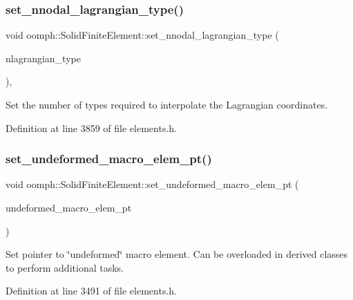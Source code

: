 \subsubsection{\texorpdfstring{set\+\_\+nnodal\+\_\+lagrangian\+\_\+type()}{set\_nnodal\_lagrangian\_type()}}
{\footnotesize\ttfamily void oomph\+::\+Solid\+Finite\+Element\+::set\+\_\+nnodal\+\_\+lagrangian\+\_\+type (\begin{DoxyParamCaption}\item[{const unsigned \&}]{nlagrangian\+\_\+type }\end{DoxyParamCaption})\hspace{0.3cm}{\ttfamily [inline]}, {\ttfamily [protected]}}



Set the number of types required to interpolate the Lagrangian coordinates. 



Definition at line 3859 of file elements.\+h.

\mbox{\label{classoomph_1_1SolidFiniteElement_a10eef57caff6c5e65784525f4dcfc165}} 
\subsubsection{\texorpdfstring{set\+\_\+undeformed\+\_\+macro\+\_\+elem\+\_\+pt()}{set\_undeformed\_macro\_elem\_pt()}}
{\footnotesize\ttfamily void oomph\+::\+Solid\+Finite\+Element\+::set\+\_\+undeformed\+\_\+macro\+\_\+elem\+\_\+pt (\begin{DoxyParamCaption}\item[{\hyperlink{classoomph_1_1MacroElement}{Macro\+Element} $\ast$}]{undeformed\+\_\+macro\+\_\+elem\+\_\+pt }\end{DoxyParamCaption})\hspace{0.3cm}{\ttfamily [inline]}}



Set pointer to \char`\"{}undeformed\char`\"{} macro element. Can be overloaded in derived classes to perform additional tasks. 



Definition at line 3491 of file elements.\+h.

